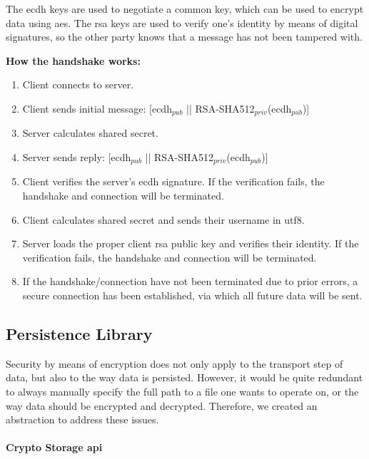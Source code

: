 The \ac{ecdh} keys are used to negotiate a common key, which can be used to encrypt data using \ac{aes}.
The \ac{rsa} keys are used to verify one's identity by means of digital signatures, so the other party knows that a
message has not been tampered with.

\textbf{How the handshake works:}
\vspace{-.75em}
\begin{enumerate}
    \setlength\itemsep{-.5em}
    \item Client connects to server.
    \item Client sends initial message: [\ac{ecdh}$_{pub}$ || RSA-SHA512$_{priv}$(\ac{ecdh}$_{pub}$)]
    \item Server calculates shared secret.
    \item Server sends reply: [\ac{ecdh}$_{pub}$ || RSA-SHA512$_{priv}$(\ac{ecdh}$_{pub}$)]
    \item Client verifies the server's \ac{ecdh} signature.
    If the verification fails, the handshake and connection will be terminated.
    \item Client calculates shared secret and sends their username in \ac{utf8}.
    \item Server loads the proper client \ac{rsa} public key and verifies their identity.
    If the verification fails, the handshake and connection will be terminated.
    \item If the handshake/connection have not been terminated due to prior errors, a secure connection has been
    established, via which all future data will be sent.
\end{enumerate}

\subsection{Persistence Library}\label{subsec:persistence-library}

Security by means of encryption does not only apply to the transport step of data, but also to the way data is
persisted.
However, it would be quite redundant to always manually specify the full path to a file one wants to operate on, or the
way data should be encrypted and decrypted.
Therefore, we created an abstraction to address these issues.

\paragraph{Crypto Storage \ac{api}}


